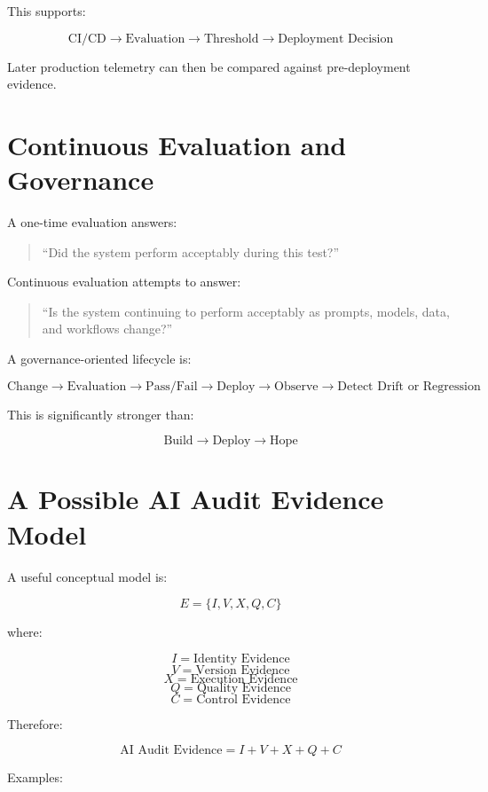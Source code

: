 \documentclass[11pt,a4paper]{article}
\begin{document}
This supports:

\[
\text{CI/CD} \rightarrow \text{Evaluation} \rightarrow \text{Threshold} \rightarrow \text{Deployment Decision}
\]

Later production telemetry can then be compared against pre-deployment evidence.

\section{Continuous Evaluation and Governance}

A one-time evaluation answers:

\begin{quote}
``Did the system perform acceptably during this test?''
\end{quote}

Continuous evaluation attempts to answer:

\begin{quote}
``Is the system continuing to perform acceptably as prompts, models, data, and workflows change?''
\end{quote}

A governance-oriented lifecycle is:

\[
\text{Change} \rightarrow \text{Evaluation} \rightarrow \text{Pass/Fail} \rightarrow \text{Deploy} \rightarrow \text{Observe} \rightarrow \text{Detect Drift or Regression}
\]

This is significantly stronger than:

\[
\text{Build} \rightarrow \text{Deploy} \rightarrow \text{Hope}
\]

\section{A Possible AI Audit Evidence Model}

A useful conceptual model is:

\[
E = \{ I, V, X, Q, C \}
\]

where:

\[
I = \text{Identity Evidence}
\]
\[
V = \text{Version Evidence}
\]
\[
X = \text{Execution Evidence}
\]
\[
Q = \text{Quality Evidence}
\]
\[
C = \text{Control Evidence}
\]

Therefore:

\[
\boxed{
\text{AI Audit Evidence} = I+V+X+Q+C
}
\]

Examples:
\end{document}
